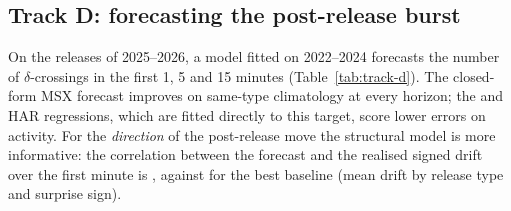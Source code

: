 \FloatBarrier
\subsection{Track D: forecasting the post-release burst}
On the \nTestReleases{} releases of 2025--2026, a model fitted on 2022--2024 forecasts the
number of $\delta$-crossings in the first 1, 5 and 15 minutes (Table~\ref{tab:track-d}).
The closed-form MSX forecast improves on same-type climatology at every horizon; the
\bestActivityModel{} and HAR regressions, which are fitted directly to this target, score lower
errors on activity. For the \emph{direction} of the post-release move the structural model is
more informative: the correlation between the forecast and the
realised signed drift over the first minute is \driftCorrOursOne{}, against
\driftCorrBaseOne{} for the best baseline (mean drift by release type and surprise sign).

\begin{table}[!htbp]\centering\small
\caption{Post-release activity forecasts on the \nTestReleases{} test releases of
2025--2026, from models fitted on 2022--2024. $N$ is the number of $\delta$-crossings after the
release; QLIKE scores the forecast of realised variance. Mean over assets; lower is better. Bold:
best; underlined: second best; shaded: our model.}\label{tab:track-d}
\setlength{\tabcolsep}{5pt}

\end{table}
